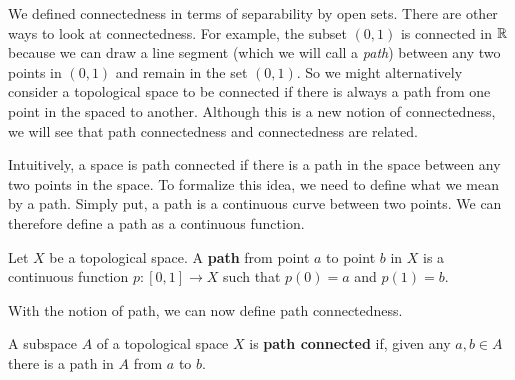 \label{chap:Path_connected_topology}


\vspace*{-17 pt}

\vspace*{13 pt}

\label{sec_path_intro}

We defined connectedness in terms of separability by open sets. There are other ways to look at connectedness. For example, the subset $(0,1)$ is connected in $\mathbb{R}$ because we can draw a line segment (which we will call a \emph{path}) between any two points in $(0,1)$ and remain in the set $(0,1)$. So we might alternatively consider a topological space to be connected if there is always a path from one point in the spaced to another. Although this is a new notion of connectedness, we will see that path connectedness and connectedness are related.
 
Intuitively, a space is path connected if there is a path in the space between any two points in the space. To formalize this idea, we need to define what we mean by a path. Simply put, a path is a continuous curve between two points. We can therefore define a path as a continuous function.

\begin{definition} Let $X$ be a topological space. A \textbf{path} from point $a$ to point $b$ in $X$ is a continuous function $p: [0,1] \to X$ such that $p(0) = a$ and $p(1)=b$. 
\end{definition}

With the notion of path, we can now define path connectedness.

\begin{definition} A subspace $A$ of a topological space $X$ is \textbf{path connected} if, given any $a, b \in A$ there is a path in $A$ from $a$ to $b$.
\end{definition}

